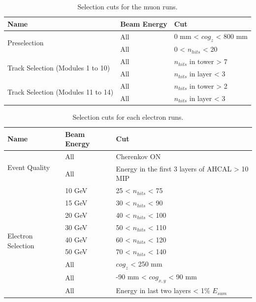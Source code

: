 \documentclass{JINST}
\begin{document}
\begin{table}[htb!]
  \centering
  \caption{Selection cuts for the muon runs.}
  \label{table:muon_sel}
  \begin{tabular}{@{}lll@{}}
    \toprule
    \multicolumn{1}{l}{\textbf{Name}} & \textbf{Beam Energy} & \textbf{Cut}\\
    \midrule
    \multirow{2}{*}{Preselection}& All & 0 mm < $cog_{z}$ < 800 mm\\& All & 0 < $n_{hits}$ < 20 \\
    \midrule
    \multirow{2}{*}{Track Selection (Modules 1 to 10)}& All & $n_{hits}$ in tower > 7 \\& All & $n_{hits}$ in layer < 3 \\
    \midrule
    \multirow{2}{*}{Track Selection (Modules 11 to 14)}& All & $n_{hits}$ in tower > 2 \\& All & $n_{hits}$ in layer < 3 \\
    \bottomrule
  \end{tabular}
\end{table}

\begin{table}[htb!]
  \centering
  \caption{Selection cuts for each electron runs.}
  \label{table:electron_sel}
  \begin{tabular}{@{}lll@{}}
    \toprule
    \multicolumn{1}{l}{\textbf{Name}} & \textbf{Beam Energy} & \textbf{Cut}\\
    \midrule
    \multirow{2}{*}{Event Quality}& All & Cherenkov ON\\& All & Energy in the first 3 layers of AHCAL > 10 MIP \\
    \midrule
    \multirow{9}{*}{Electron Selection}& 10 GeV & 25 < $n_{hits}$ < 75 \\& 15 GeV & 30 < $n_{hits}$ < 90 \\& 20 GeV & 40 < $n_{hits}$ < 100 \\& 30 GeV & 50 < $n_{hits}$ < 110 \\& 40 GeV & 60 < $n_{hits}$ < 120 \\& 50 GeV & 70 < $n_{hits}$ < 140 \\& All & $cog_{z}$ < 250 mm\\& All & -90 mm < $cog_{x, y}$ < 90 mm \\& All & Energy in last two layers < 1\% $E_{sum}$ \\
    \bottomrule
  \end{tabular}
\end{table}
\end{document}
